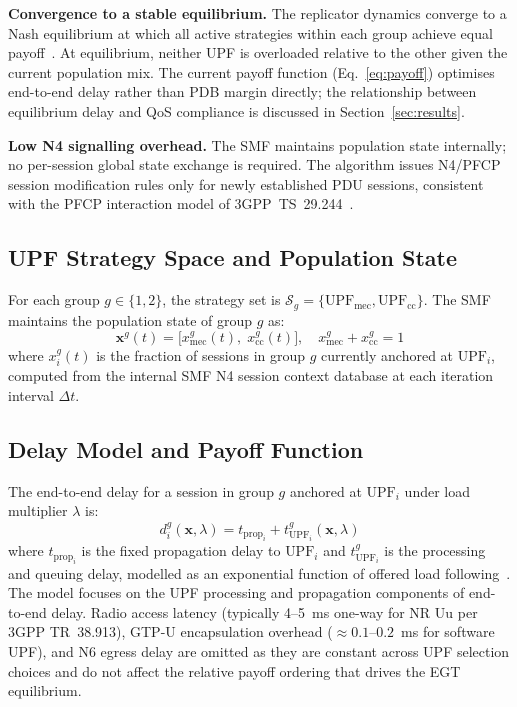 \documentclass[conference]{IEEEtran}
\begin{document}
\textbf{Convergence to a stable equilibrium.} The
replicator dynamics converge to a Nash equilibrium at
which all active strategies within each group achieve
equal payoff~\cite{Alevizaki2021upf}. At equilibrium,
neither UPF is overloaded relative to the other given
the current population mix. The current payoff function
(Eq.~\eqref{eq:payoff}) optimises end-to-end delay
rather than PDB margin directly; the relationship between
equilibrium delay and QoS compliance is discussed in
Section~\ref{sec:results}.

\textbf{Low N4 signalling overhead.} The SMF maintains
population state internally; no per-session global state
exchange is required. The algorithm issues N4/PFCP
session modification rules only for newly established
PDU sessions, consistent with the PFCP interaction model
of 3GPP~TS~29.244~\cite{3gpp_ts29244}.

\subsection{UPF Strategy Space and Population State}
\label{sec:strategy}

For each group $g \in \{1,2\}$, the strategy set is
$\mathcal{S}_g = \{\text{UPF}_\text{mec},
\text{UPF}_\text{cc}\}$.
The SMF maintains the population state of group $g$ as:
\begin{equation}
    \mathbf{x}^g(t) = \bigl[x_\text{mec}^g(t),\;
    x_\text{cc}^g(t)\bigr], \quad
    x_\text{mec}^g + x_\text{cc}^g = 1
    \label{eq:popstate}
\end{equation}
where $x_i^g(t)$ is the fraction of sessions in group
$g$ currently anchored at $\text{UPF}_i$, computed from
the internal SMF N4 session context database at each
iteration interval $\Delta t$.

\subsection{Delay Model and Payoff Function}
\label{sec:delay}

The end-to-end delay for a session in group $g$ anchored
at $\text{UPF}_i$ under load multiplier $\lambda$ is:
\begin{equation}
    d_i^g(\mathbf{x},\lambda) = t_{\text{prop}_i}
    + t_{\text{UPF}_i}^g(\mathbf{x},\lambda)
    \label{eq:delay}
\end{equation}
where $t_{\text{prop}_i}$ is the fixed propagation delay
to $\text{UPF}_i$ and $t_{\text{UPF}_i}^g$ is the
processing and queuing delay, modelled as an exponential
function of offered load following~\cite{Alevizaki2021upf}.
The model focuses on the UPF processing and propagation
components of end-to-end delay. Radio access latency (typically
4--5~ms one-way for NR Uu per 3GPP TR~38.913),
GTP-U encapsulation overhead ($\approx 0.1$--$0.2$~ms for
software UPF), and N6 egress delay are omitted as they are
constant across UPF selection choices and do not affect the
relative payoff ordering that drives the EGT equilibrium.
\end{document}
